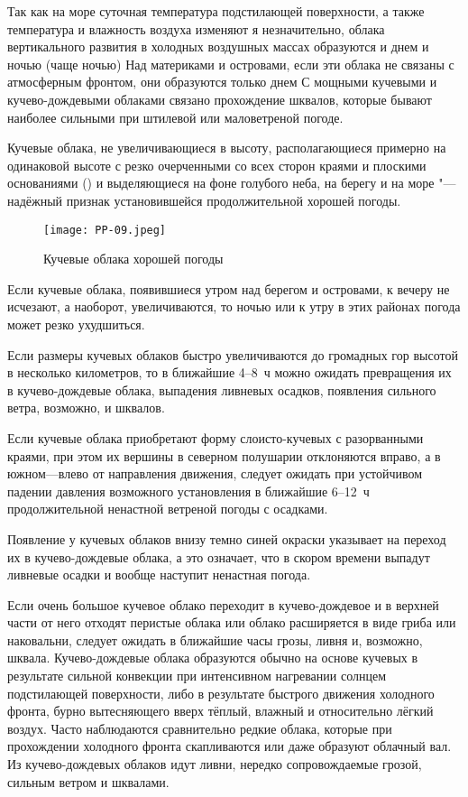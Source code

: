 Так как на море суточная температура подстилающей поверхности, а также
температура и влажность воздуха изменяют я незначительно, облака
вертикального развития в холодных воздушных массах образуются и днем и
ночью (чаще ночью) Над материками и островами, если эти облака не
связаны с атмосферным фронтом, они образуются только днем С мощными
кучевыми и кучево-дождевыми облаками связано прохождение шквалов,
которые бывают наиболее сильными при штилевой или маловетреной погоде.

 Кучевые облака, не увеличивающиеся в высоту, располагающиеся
примерно на одинаковой высоте с резко очерченными со всех сторон
краями и плоскими основаниями () и выделяющиеся на фоне
голубого неба, на берегу и на море "--- надёжный признак установившейся
продолжительной хорошей погоды.

\begin{figure}[htb]
  \centering{}
  \texttt{[image: PP-09.jpeg]}
  \caption{Кучевые облака хорошей погоды}
  \label{fig:pp09}
  \small
  \centering{}
\end{figure}

 Если кучевые облака, появившиеся утром над берегом и островами,
к вечеру не исчезают, а наоборот, увеличиваются, то ночью или к утру в
этих районах погода может резко ухудшиться.

 Если размеры кучевых облаков быстро увеличиваются до громадных
гор высотой в несколько километров, то в ближайшие 4--8~ч можно ожидать
превращения их в кучево-дождевые облака, выпадения ливневых осадков,
появления сильного ветра, возможно, и шквалов.

 Если кучевые облака приобретают форму слоисто-кучевых с
разорванными краями, при этом их вершины в северном полушарии
отклоняются вправо, а в южном—влево от направления движения, следует
ожидать при устойчивом падении давления возможного установления в
ближайшие 6--12~ч продолжительной ненастной ветреной погоды с
осадками.

 Появление у кучевых облаков внизу темно синей окраски указывает
на переход их в кучево-дождевые облака, а это означает, что в скором
времени выпадут ливневые осадки и вообще наступит ненастная погода.

 Если очень большое кучевое облако переходит в кучево-дождевое и
в верхней части от него отходят перистые облака или облако расширяется
в виде гриба или наковальни, следует ожидать в ближайшие часы грозы,
ливня и, возможно, шквала. Кучево-дождевые облака образуются обычно на
основе кучевых в результате сильной конвекции при интенсивном
нагревании солнцем подстилающей поверхности, либо в результате
быстрого движения холодного фронта, бурно вытесняющего вверх тёплый,
влажный и относительно лёгкий воздух. Часто наблюдаются сравнительно
редкие облака, которые при прохождении холодного фронта скапливаются
или даже образуют облачный вал. Из кучево-дождевых облаков идут ливни,
нередко сопровождаемые грозой, сильным ветром и шквалами.

